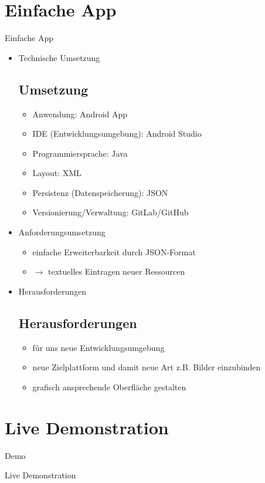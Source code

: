 \documentclass[10pt,fleqn]{beamer}
\begin{document}
\section{Einfache App}
\begin{frame}[t]{Einfache App}
	\begin{itemize}
		\item Technische Umsetzung
		\subsection{Umsetzung}
		\begin{itemize}
			\item Anwendung: Android App
			\item IDE (Entwicklungsumgebung): Android Studio
			\item Programmiersprache: Java
			\item Layout: XML
			\item Persistenz (Datenspeicherung): JSON
			\item Versionierung/Verwaltung: GitLab/GitHub
		\end{itemize}
		\item Anforderungsumsetzung
			\begin{itemize}
			\item einfache Erweiterbarkeit durch JSON-Format
			\item[] $\rightarrow$ textuelles Eintragen neuer Ressourcen
			\end{itemize}
		\item Herausforderungen
		\subsection{Herausforderungen}
		\begin{itemize}
			\item für uns neue Entwicklungsumgebung
			\item neue Zielplattform und damit neue Art z.B. Bilder einzubinden
			\item grafisch ansprechende Oberfläche gestalten
		\end{itemize}
	\end{itemize}
\end{frame}

\section{Live Demonstration}
\begin{frame}[c]{Demo}
	\begin{block}{}
		\begin{center}
			\begin{Huge}
			Live Demonstration
			\end{Huge}
		\end{center}
	\end{block}
\end{frame}
\end{document}
